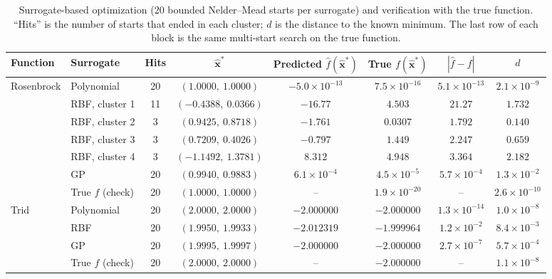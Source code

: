 \begin{table}[!htbp]
  \centering
  \caption{Surrogate-based optimization (20 bounded Nelder--Mead starts per surrogate) and verification with the true function. ``Hits'' is the number of starts that ended in each cluster; $d$ is the distance to the known minimum. The last row of each block is the same multi-start search on the true function.}
  \label{tab:opt}
  \begin{adjustbox}{max width=\linewidth}
  \begin{tabular}{llcccccc}
    \toprule
    Function & Surrogate & Hits & $\hat{\mathbf{x}}^*$ & Predicted $\hat f(\hat{\mathbf{x}}^*)$ & True $f(\hat{\mathbf{x}}^*)$ & $|\hat f-f|$ & $d$ \\
    \midrule
    \multirow{7}{*}{Rosenbrock} & Polynomial & 20 & $(1.0000,\ 1.0000)$ & $-5.0\times10^{-13}$ & $7.5\times10^{-16}$ & $5.1\times10^{-13}$ & $2.1\times10^{-9}$ \\
     & RBF, cluster 1 & 11 & $(-0.4388,\ 0.0366)$ & $-16.77$ & $4.503$ & $21.27$ & $1.732$ \\
     & RBF, cluster 2 & 3 & $(0.9425,\ 0.8718)$ & $-1.761$ & $0.0307$ & $1.792$ & $0.140$ \\
     & RBF, cluster 3 & 3 & $(0.7209,\ 0.4026)$ & $-0.797$ & $1.449$ & $2.247$ & $0.659$ \\
     & RBF, cluster 4 & 3 & $(-1.1492,\ 1.3781)$ & $8.312$ & $4.948$ & $3.364$ & $2.182$ \\
     & GP & 20 & $(0.9940,\ 0.9883)$ & $6.1\times10^{-4}$ & $4.5\times10^{-5}$ & $5.7\times10^{-4}$ & $1.3\times10^{-2}$ \\
     & True $f$ (check) & 20 & $(1.0000,\ 1.0000)$ & -- & $1.9\times10^{-20}$ & -- & $2.6\times10^{-10}$ \\
    \midrule
    \multirow{4}{*}{Trid} & Polynomial & 20 & $(2.0000,\ 2.0000)$ & $-2.000000$ & $-2.000000$ & $1.3\times10^{-14}$ & $1.0\times10^{-8}$ \\
     & RBF & 20 & $(1.9950,\ 1.9933)$ & $-2.012319$ & $-1.999964$ & $1.2\times10^{-2}$ & $8.4\times10^{-3}$ \\
     & GP & 20 & $(1.9995,\ 1.9997)$ & $-2.000000$ & $-2.000000$ & $2.7\times10^{-7}$ & $5.7\times10^{-4}$ \\
     & True $f$ (check) & 20 & $(2.0000,\ 2.0000)$ & -- & $-2.000000$ & -- & $1.1\times10^{-8}$ \\
    \bottomrule
  \end{tabular}
  \end{adjustbox}
\end{table}

